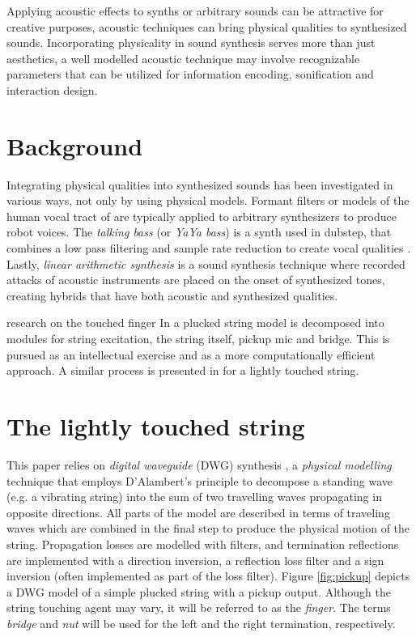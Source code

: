 \documentclass{sigchi}
\begin{document}
Applying acoustic effects to synths or arbitrary sounds can be attractive for creative purposes, acoustic techniques can bring physical qualities to synthesized sounds.
Incorporating physicality in sound synthesis serves more than just aesthetics, a well modelled acoustic technique may involve recognizable parameters that can be utilized for information encoding, sonification and interaction design.

\section{Background}
Integrating physical qualities into synthesized sounds has been investigated in various ways, not only by using physical models.
Formant filters or models of the human vocal tract of are typically applied to arbitrary synthesizers to produce robot voices.
The \textit{talking bass} (or \textit{YaYa bass}) is a synth used in dubstep, that combines a low pass filtering and sample rate reduction to create vocal qualities \cite{audio_digital_how_2014, dorincourt_reason_2010}.
Lastly, \textit{linear arithmetic synthesis} \cite{russ_l_1987} is a sound synthesis technique where recorded attacks of acoustic instruments are placed on the onset of synthesized tones, creating hybrids that have both acoustic and synthesized qualities.

research on the touched finger
In \cite{karjalainen_plucked-string_1998} a plucked string model is decomposed into modules for string excitation, the string itself, pickup mic and bridge.
This is pursued as an intellectual exercise and as a more computationally efficient approach.
A similar process is presented in \cite{pakarinen_physical_2005} for a lightly touched string.

\section{The lightly touched string}

This paper relies on \textit{digital waveguide} (DWG) synthesis \cite{smith_physical_1992}, a \textit{physical modelling} technique that employs D'Alambert's principle to decompose a standing wave (e.g. a vibrating string) into the sum of two travelling waves propagating in opposite directions.
All parts of the model are described in terms of traveling waves which are combined in the final step to produce the physical motion of the string.
Propagation losses are modelled with filters, and termination reflections are implemented with a direction inversion, a reflection loss filter and a sign inversion (often implemented as part of the loss filter).
Figure \ref{fig:pickup} depicts a DWG model of a simple plucked string with a pickup output.
Although the string touching agent may vary, it will be referred to as the \textit{finger}.
The terms \textit{bridge} and \textit{nut} will be used for the left and the right termination, respectively.
\end{document}
